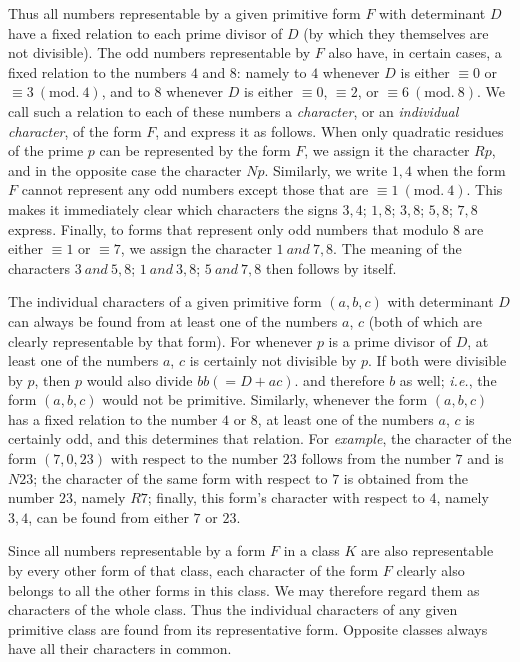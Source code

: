 Thus all numbers representable by a given primitive form $F$ with determinant $D$ have a fixed relation to each prime divisor of $D$ (by which they themselves are not divisible). The odd numbers representable by $F$ also have, in certain cases, a fixed relation to the numbers $4$ and $8$: namely to $4$ whenever $D$ is either $\equiv0$ or $\equiv3\ (\mathrm{mod.}\ 4)$, and to $8$ whenever $D$ is either $\equiv0$, $\equiv2$, or $\equiv6\ (\mathrm{mod.}\ 8)$. We call such a relation to each of these numbers a \textit{character}, or an \textit{individual character}, of the form $F$, and express it as follows. When only quadratic residues of the prime $p$ can be represented by the form $F$, we assign it the character $Rp$, and in the opposite case the character $Np$. Similarly, we write $1,4$ when the form $F$ cannot represent any odd numbers except those that are $\equiv1\ (\mathrm{mod.}\ 4)$. This makes it immediately clear which characters the signs $3,4$; $1,8$; $3,8$; $5,8$; $7,8$ express. Finally, to forms that represent only odd numbers that modulo
$8$ are either $\equiv1$ or $\equiv7$, we assign the character $1\ \mathit{and}\ 7,8$. The meaning of the characters $3\ \mathit{and}\ 5,8$; $1\ \mathit{and}\ 3,8$; $5\ \mathit{and}\ 7,8$ then follows by itself.

The individual characters of a given primitive form $(a,b,c)$ with determinant $D$ can always be found from at least one of the numbers $a$, $c$ (both of which are clearly representable by that form). For whenever $p$ is a prime divisor of $D$, at least one of the numbers $a$, $c$ is certainly not divisible by $p$. If both were divisible by $p$, then $p$ would also divide $bb(=D+ac)$. and therefore $b$ as well; \textit{i.e.}, the form $(a,b,c)$ would not be primitive. Similarly, whenever the form $(a,b,c)$ has a fixed relation to the number $4$ or $8$, at least one of the numbers $a$, $c$ is certainly odd, and this determines that relation. For \textit{example}, the character of the form $(7,0,23)$ with respect to the number $23$ follows from the number $7$ and is $N23$; the character of the same form with respect to $7$ is obtained from the number $23$, namely $R7$; finally, this form's character with respect to $4$, namely $3,4$, can be found from either $7$ or $23$.

Since all numbers representable by a form $F$ in a class $K$ are also representable by every other form of that class, each character of the form $F$ clearly also belongs to all the other forms in this class. We may therefore regard them as characters of the whole class. Thus the individual characters of any given primitive class are found from its representative form. Opposite classes always have all their characters in common.
